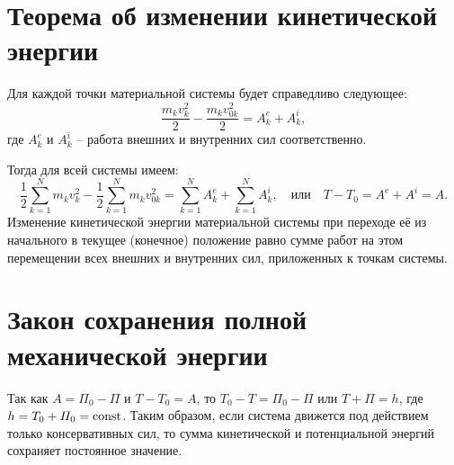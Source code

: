 \section{Теорема об изменении кинетической энергии}
Для каждой точки материальной системы будет справедливо следующее:
\[
    \frac{m_k v_k^2}{2} - \frac{m_k v_{0k}^2}{2} = A^e_k + A^i_k,
\]
где \( A^e_k \) и \( A^i_k \) -- работа внешних и внутренних сил соответственно.

Тогда для всей системы имеем:
\[
    \frac{1}{2}\sum_{k=1}^N m_k v_k^2 - \frac{1}{2}\sum_{k=1}^N m_k v_{0k}^2 =
    \sum_{k=1}^N A^e_k + \sum_{k=1}^N A^i_k, \quad \text{или} \quad
    T - T_0 = A^e + A^i = A.
\]
Изменение кинетической энергии материальной системы при переходе её из
начального в текущее (конечное) положение равно сумме работ на этом перемещении
всех внешних и внутренних сил, приложенных к точкам системы.

\section{Закон сохранения полной механической энергии}
Так как \( A = \varPi_0 - \varPi \) и \( T - T_0 = A \), то \( T_0 - T =
\varPi_0 - \varPi \) или \( T + \varPi = h \), где \( h = T_0 + \varPi_0 =
\mathrm{const} \).
Таким образом, если система движется под действием только консервативных сил, то
сумма кинетической и потенциальной энергий сохраняет постоянное значение.

\newpage
